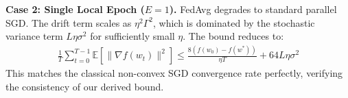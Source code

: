 \documentclass{article}
\begin{document}
\textbf{Case 2: Single Local Epoch ($E = 1$).}
FedAvg degrades to standard parallel SGD. The drift term scales as $\eta^2 \Gamma^2$, which is dominated by the stochastic variance term $L \eta \sigma^2$ for sufficiently small $\eta$. The bound reduces to:
\begin{align*}
    \frac{1}{T} \sum_{t=0}^{T-1} \mathbb{E}[\|\nabla f(w_t)\|^2] \leq \frac{8(f(w_0) - f(w^*))}{\eta T} + 64 L \eta \sigma^2
\end{align*}
This matches the classical non-convex SGD convergence rate perfectly, verifying the consistency of our derived bound.
\end{document}

